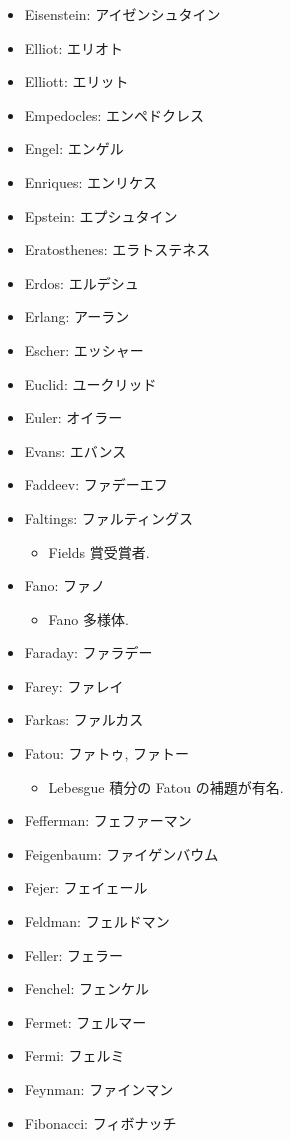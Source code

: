 \documentclass[openany, a4paper, oneside]{jsbook}
\begin{document}
\begin{itemize}
\item Eisenstein: アイゼンシュタイン
\item Elliot: エリオト
\item Elliott: エリット
\item Empedocles: エンペドクレス
\item Engel: エンゲル
\item Enriques: エンリケス
\item Epstein: エプシュタイン
\item Eratosthenes: エラトステネス
\item Erdos: エルデシュ
\item Erlang: アーラン
\item Escher: エッシャー
\item Euclid: ユークリッド
\item Euler: オイラー
\item Evans: エバンス
\item Faddeev: ファデーエフ
\item Faltings: ファルティングス
\begin{itemize}
\item Fields 賞受賞者.
\end{itemize}
\item Fano: ファノ
\begin{itemize}
\item Fano 多様体.
\end{itemize}
\item Faraday: ファラデー
\item Farey: ファレイ
\item Farkas: ファルカス
\item Fatou: ファトゥ, ファトー
\begin{itemize}
\item Lebesgue 積分の Fatou の補題が有名.
\end{itemize}
\item Fefferman: フェファーマン
\item Feigenbaum: ファイゲンバウム
\item Fejer: フェイェール
\item Feldman: フェルドマン
\item Feller: フェラー
\item Fenchel: フェンケル
\item Fermet: フェルマー
\item Fermi: フェルミ
\item Feynman: ファインマン
\item Fibonacci: フィボナッチ

\end{itemize}
\end{document}
